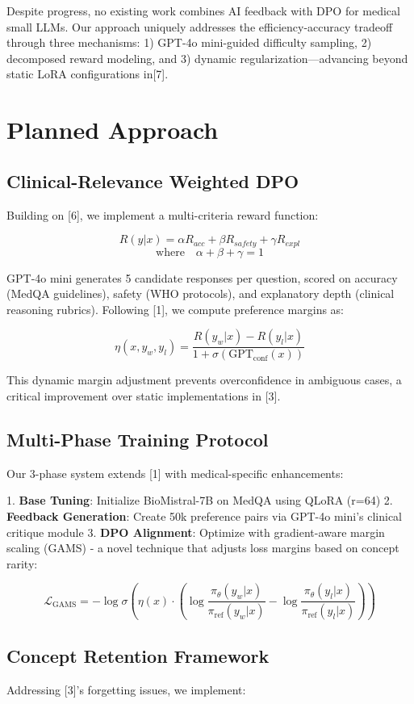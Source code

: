 \documentclass[11pt,a4paper]{article}
\begin{document}
Despite progress, no existing work combines AI feedback with DPO for medical small LLMs. Our approach uniquely addresses the efficiency-accuracy tradeoff through three mechanisms: 1) GPT-4o mini-guided difficulty sampling, 2) decomposed reward modeling, and 3) dynamic regularization—advancing beyond static LoRA configurations in[7].

\section{Planned Approach}
\subsection{Clinical-Relevance Weighted DPO}
Building on [6], we implement a multi-criteria reward function:

\[
R(y|x) = \alpha R_{acc} + \beta R_{safety} + \gamma R_{expl} 
\]
\[
\text{where} \quad \alpha+\beta+\gamma=1
\]

GPT-4o mini generates 5 candidate responses per question, scored on accuracy (MedQA guidelines), safety (WHO protocols), and explanatory depth (clinical reasoning rubrics). Following [1], we compute preference margins as:

\[
\eta(x,y_w,y_l) = \frac{R(y_w|x) - R(y_l|x)}{1 + \sigma(\text{GPT}_{\text{conf}}(x))}
\]

This dynamic margin adjustment prevents overconfidence in ambiguous cases, a critical improvement over static implementations in [3].

\subsection{Multi-Phase Training Protocol}
Our 3-phase system extends [1] with medical-specific enhancements:

1. \textbf{Base Tuning}: Initialize BioMistral-7B on MedQA using QLoRA (r=64)
2. \textbf{Feedback Generation}: Create 50k preference pairs via GPT-4o mini's clinical critique module
3. \textbf{DPO Alignment}: Optimize with gradient-aware margin scaling (GAMS) - a novel technique that adjusts loss margins based on concept rarity:

\[
\mathcal{L}_{\text{GAMS}} = -\log\sigma\left(\eta(x) \cdot (\log\frac{\pi_\theta(y_w|x)}{\pi_{\text{ref}}(y_w|x)} - \log\frac{\pi_\theta(y_l|x)}{\pi_{\text{ref}}(y_l|x)})\right)
\]

\subsection{Concept Retention Framework}
Addressing [3]'s forgetting issues, we implement:
\end{document}
